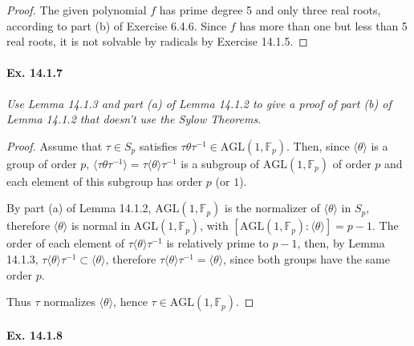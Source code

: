 \documentclass[11pt,a4paper]{article}
\begin{document}
\begin{proof}
The given polynomial $f$ has prime degree 5 and only three real roots, according to part (b) of Exercise 6.4.6. Since $f$ has more than one but less than 5 real roots, it is not solvable by radicals by Exercise 14.1.5. 

\end{proof}

\paragraph{Ex. 14.1.7}

{\it Use Lemma 14.1.3 and part (a) of Lemma 14.1.2 to give a proof of part (b) of Lemma 14.1.2 that doesn't use the Sylow Theorems.
}

\begin{proof}
Assume that $\tau\in S_p$ satisfies $\tau\theta\tau^{-1}\in \mathrm{AGL}(1,\mathbb{F}_p)$. Then, since $\langle\theta\rangle$ is a group of order $p$, $\langle\tau\theta\tau^{-1}\rangle=\tau\langle\theta\rangle\tau^{-1}$ is a subgroup of $\mathrm{AGL}(1,\mathbb{F}_p)$ of order $p$ and each element of this subgroup has order $p$ (or $1$).

By part (a) of Lemma 14.1.2, $\mathrm{AGL}(1,\mathbb{F}_p)$ is the normalizer of $\langle\theta\rangle$ in $S_p$, therefore $\langle\theta\rangle$ is normal in $\mathrm{AGL}(1,\mathbb{F}_p)$, with $[\mathrm{AGL}(1,\mathbb{F}_p):\langle\theta\rangle]=p-1$. The order of each element of $\tau\langle\theta\rangle\tau^{-1}$ is relatively prime to $p-1$, then, by Lemma 14.1.3, $\tau\langle\theta\rangle\tau^{-1}\subset\langle\theta\rangle$, therefore $\tau\langle\theta\rangle\tau^{-1}=\langle\theta\rangle$, since both groups have the same order $p$.  

Thus $\tau$ normalizes $\langle\theta\rangle$, hence $\tau\in \mathrm{AGL}(1,\mathbb{F}_p)$.
\end{proof}
\paragraph{Ex. 14.1.8}
\end{document}
